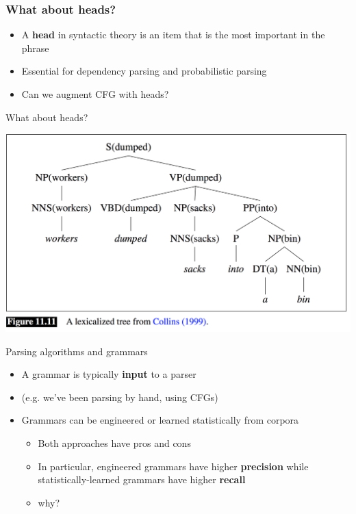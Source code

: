 \documentclass{beamer}
\begin{document}
\begin{frame}
\frametitle{What about heads?}

\begin{itemize}
\item A {\bf head} in syntactic theory is an item that is the most important in the phrase
\item Essential for dependency parsing and probabilistic parsing
\item Can we augment CFG with heads?
\end{itemize}
\end{frame}

\begin{frame}{What about heads?}

  \includegraphics[width=\textwidth]{figures/heads}

\end{frame}

\begin{frame}{Parsing algorithms and grammars}
  \begin{itemize}
  \item A grammar is typically {\bf input} to a parser
  \item (e.g. we've been parsing by hand, using CFGs)
  \item Grammars can be engineered or learned statistically from corpora
    \begin{itemize}
    \item Both approaches have pros and cons
    \item In particular, engineered grammars have higher {\bf
        precision} while statistically-learned grammars have higher
      {\bf recall}
    \item why?
    \end{itemize}
  \end{itemize}
\end{frame}
\end{document}
